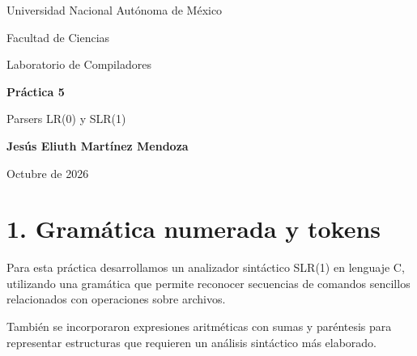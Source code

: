 \documentclass[11pt,letterpaper]{article}
\begin{document}

\begin{titlepage}
\centering

\vspace*{1.5cm}

{\Large Universidad Nacional Autónoma de México\par}

\vspace{0.5cm}

{\Large Facultad de Ciencias\par}

\vspace{2cm}

{\Large Laboratorio de Compiladores\par}

\vspace{1.5cm}

{\Huge\bfseries Práctica 5\par}

\vspace{0.5cm}

{\LARGE Parsers LR(0) y SLR(1)\par}

\vspace{2cm}

{\Large\bfseries Jesús Eliuth Martínez Mendoza\par}

\vfill

{\Large Octubre de 2026\par}

\end{titlepage}


\section*{1. Gramática numerada y tokens}

Para esta práctica desarrollamos un analizador sintáctico
SLR(1) en lenguaje C, utilizando una gramática que permite
reconocer secuencias de comandos sencillos relacionados
con operaciones sobre archivos.

También se incorporaron expresiones aritméticas con sumas
y paréntesis para representar estructuras que requieren
un análisis sintáctico más elaborado.
\end{document}
